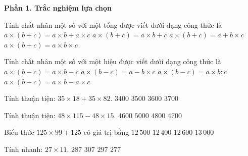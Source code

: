 \textbf{Phần 1. Trắc nghiệm lựa chọn}

\begin{ex} %
Tính chất nhân một số với một tổng được viết dưới dạng công thức là
\choice
{\True $a \times (b + c) = a \times b + a \times c$}
{$a \times (b + c) = a \times b + c$}
{$a \times (b + c) = a + b \times c$}
{$a \times (b + c) = a \times b \times c$}
\end{ex}

\begin{ex} %
Tính chất nhân một số với một hiệu được viết dưới dạng công thức là
\choice
{$a \times (b - c) = a \times b - c$}
{$a \times (b - c) = a - b \times c$}
{$a \times (b - c) = a \times b : c$}
{\True $a \times (b - c) = a \times b - a \times c$}
\end{ex}

\begin{ex} %
Tính thuận tiện: $35 \times 18 + 35 \times 82$.
\choice
{$3400$}
{\True $3500$}
{$3600$}
{$3700$}
\end{ex}

\begin{ex} %
Tính thuận tiện: $48 \times 115 - 48 \times 15$.
\choice
{$4600$}
{$5000$}
{\True $4800$}
{$4700$}
\end{ex}

\begin{ex} %
Biểu thức $125 \times 99 + 125$ có giá trị bằng
\choice
{\True $12\,500$}
{$12\,400$}
{$12\,600$}
{$13\,000$}
\end{ex}

\begin{ex} %
Tính nhanh: $27 \times 11$.
\choice
{$287$}
{$307$}
{\True $297$}
{$277$}
\end{ex}

